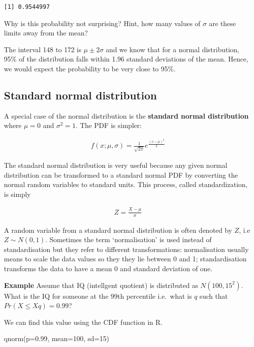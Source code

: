 \documentclass[
  oneside]{krantz}
\newenvironment{Shaded}{\begin{snugshade}}{\end{snugshade}}
\newcommand{\AttributeTok}[1]{\textcolor[rgb]{0.77,0.63,0.00}{#1}}
\newcommand{\DecValTok}[1]{\textcolor[rgb]{0.00,0.00,0.81}{#1}}
\newcommand{\FloatTok}[1]{\textcolor[rgb]{0.00,0.00,0.81}{#1}}
\newcommand{\FunctionTok}[1]{\textcolor[rgb]{0.00,0.00,0.00}{#1}}
\newcommand{\NormalTok}[1]{#1}
\begin{document}
\begin{verbatim}
[1] 0.9544997
\end{verbatim}

Why is this probability not surprising? Hint, how many values of \(\sigma\) are these limits away from the mean?

The interval 148 to 172 is \(\mu \pm 2 \sigma\) and we know that for a normal distribution, 95\% of the distribution falls within 1.96 standard deviations of the mean. Hence, we would expect the probability to be very close to 95\%.

\hypertarget{standard-normal-distribution}{%
\subsection{Standard normal distribution}\label{standard-normal-distribution}}

A special case of the normal distribution is the \textbf{standard normal distribution} where \(\mu=0\) and \(\sigma^2=1\). The PDF is simpler:

\begin{align}
f(x; \mu, \sigma) = \frac{1}{\sqrt{2\pi}}e^{\frac{(x - \mu)^2}{2}}
\end{align}

The standard normal distribution is very useful because any given normal distribution can be transformed to a standard normal PDF by converting the normal random variables to standard units. This process, called standardization, is simply

\begin{align}
Z = \frac{X - \mu}{\sigma}
\end{align}

A random variable from a standard normal distribution is often denoted by \(Z\), i.e \(Z \sim N(0, 1)\). Sometimes the term `normalisation' is used instead of standardisation but they refer to different transformations: normalisation usually means to scale the data values so they they lie between 0 and 1; standardisation transforms the data to have a mean 0 and standard deviation of one.

\textbf{Example} Assume that IQ (intellgent quotient) is distributed as \(N(100,15^2)\). What is the IQ for someone at the 99th percentile i.e.~what is \(q\) such that \(Pr(X \le X q)=0.99\)?

We can find this value using the CDF function in R.

\begin{Shaded}
\begin{Highlighting}[]
\FunctionTok{qnorm}\NormalTok{(}\AttributeTok{p=}\FloatTok{0.99}\NormalTok{, }\AttributeTok{mean=}\DecValTok{100}\NormalTok{, }\AttributeTok{sd=}\DecValTok{15}\NormalTok{)}
\end{Highlighting}
\end{Shaded}
\end{document}
